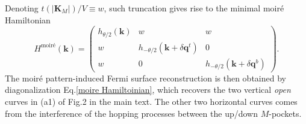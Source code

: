 \begin{subappendices}
\begin{figure}[!htp]
	\label{fig:M-pocket Moire}
\end{figure}
Denoting $t(|\bm{K}_M|)/V\equiv w$, such truncation gives rise to the minimal moir\'{e} Hamiltonian
\begin{equation}\label{moire Hamiltoinian}
	H^{\text{moir\'{e}}}(\bm{k})=\left(\begin{array}{ccc}
		h_{\theta/2}(\bm{k}) & w & w \\
		w & h_{-\theta/2}(\bm{k}+\delta\bm{q}^t) & 0 \\
		w & 0 & h_{-\theta/2}(\bm{k}+\delta\bm{q}^b)
	\end{array}\right).
\end{equation}
The moir\'{e} pattern-induced Fermi surface reconstruction is then obtained by diagonalization Eq.\eqref{moire Hamiltoinian}, which recovers the two vertical \emph{open} curves in (a1) of Fig.2 in the main text. The other two horizontal curves comes from the interference of the hopping processes between the up/down $M$-pockets.

\end{subappendices}